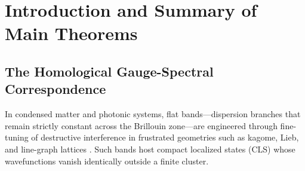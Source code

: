 \documentclass[11pt,a4paper]{article}
\theoremstyle{definition}
\newcommand{\Q}{\mathbb{Q}}
\newcommand{\U}{\mathrm{U}}
\begin{document}
\begin{abstract}
Finally, the single-face holonomy class functions of $\U(N)$ map to $N$ non-interacting fermions in a Mathieu potential. Because the resulting one-body Hamiltonian has additive spectrum, the charge-parity splitting of the fundamental doublet is controlled by Mathieu band gaps at the Fermi surface and vanishes through order $N-2$; this is what makes the four intermediate irrep channels cancel at every even order and yields the grading law $S_m = O(N^{-(m+1)})$.

We are explicit about scope. Sections~\ref{sec:verification} and~\ref{sec:scope} separate what is proved unconditionally over $\Q(N)$, what is machine-checked in Lean~4 (three specific algebraic facts, not the full theorem list), and what is established numerically only --- notably a sharpening of the doublet result and the tower hypothesis (T) underlying the stronger $N^{-(2m-1)}$ grading law, which is \emph{not} proved here.
\end{abstract}

\newpage
\tableofcontents
\newpage

\section{Introduction and Summary of Main Theorems}\label{sec:intro}

\subsection{The Homological Gauge-Spectral Correspondence}

In condensed matter and photonic systems, flat bands---dispersion branches that remain strictly constant across the Brillouin zone---are engineered through fine-tuning of destructive interference in frustrated geometries such as kagome, Lieb, and line-graph lattices \cite{Sutherland1986,Lieb1989,Mielke1991,Tasaki1992,BergmanWuBalents2008,LeykamAndreanovFlach2018,Kollar2020}. Such bands host compact localized states (CLS) whose wavefunctions vanish identically outside a finite cluster.
\end{document}
